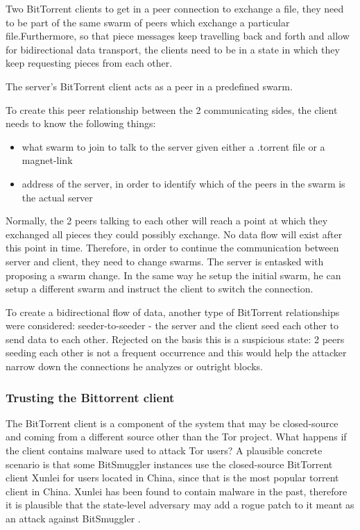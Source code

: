 \documentclass[11pt]{article} %
\newcommand{\projectName}{BitSmuggler }
\begin{document}
Two BitTorrent clients to get in a peer connection to exchange a file, they need to be part of the same swarm of peers which exchange a particular file.Furthermore, so that piece messages keep travelling back and forth and allow for bidirectional data transport, the clients need to be in a state in which they keep requesting pieces from each other.

The server's BitTorrent client acts as a peer in a predefined swarm.

To create this peer relationship between the 2 communicating sides,  the client needs to know the following things:
\begin{itemize}
\item what swarm to join to talk to the server given either a .torrent file or a magnet-link
\item address of the server, in order to identify which of the peers in the swarm is the actual server
\end{itemize}

Normally, the 2 peers talking to each other will reach a point at which they exchanged all pieces they could possibly exchange. No data flow will exist after this point in time. Therefore, in order to continue the communication between server and client, they need to change swarms. The server is entasked with proposing a swarm change. In the same way he setup the initial swarm, he can setup a different swarm and instruct the client to switch the connection.

To create a bidirectional flow of data, another type of BitTorrent relationships were considered: seeder-to-seeder - the server and the client seed each other to send data to each other. Rejected on the basis this is a suspicious state: 2 peers seeding each other is not a frequent occurrence and this would help the attacker narrow down the connections he analyzes or outright blocks.


\subsubsection{Trusting the Bittorrent client}
\label{subsubsec:trustingBitTorrentClient}


The BitTorrent client is a component of the system that may be closed-source and coming from a different source other than the Tor project. What happens if the client contains malware used to attack Tor users? A plausible concrete scenario is that some \projectName instances use the closed-source BitTorrent client Xunlei for users located in China, since that is the most popular torrent client in China. Xunlei has been found to contain malware in the past, therefore it is plausible that the state-level adversary may add a rogue patch to it meant as an attack against \projectName.
\end{document}
